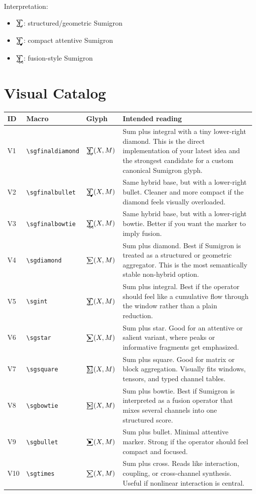 \documentclass[12pt]{article}
\newcommand{\sgoverlay}[2]{\mathop{\mathchoice
  {\ooalign{\hfil$\displaystyle\sum$\hfil\cr\hfil$#1$\hfil\cr}}
  {\ooalign{\hfil$\textstyle\sum$\hfil\cr\hfil$#2$\hfil\cr}}
  {\ooalign{\hfil$\scriptstyle\sum$\hfil\cr\hfil$#2$\hfil\cr}}
  {\ooalign{\hfil$\scriptscriptstyle\sum$\hfil\cr\hfil$#2$\hfil\cr}}
}}
\newcommand{\sgsumintright}[1]{\mathop{\mathchoice
  {\ooalign{
    \hfil$\displaystyle\sum$\hfil\cr
    \hfil$\displaystyle\int$\hfil\cr
    \hidewidth\raisebox{-1.35ex}{\kern1.25ex$\scriptstyle #1$}\hidewidth\cr
  }}
  {\ooalign{
    \hfil$\textstyle\sum$\hfil\cr
    \hfil$\textstyle\int$\hfil\cr
    \hidewidth\raisebox{-1.00ex}{\kern1.00ex$\scriptscriptstyle #1$}\hidewidth\cr
  }}
  {\ooalign{
    \hfil$\scriptstyle\sum$\hfil\cr
    \hfil$\scriptstyle\int$\hfil\cr
    \hidewidth\raisebox{-0.75ex}{\kern0.75ex$\scriptscriptstyle #1$}\hidewidth\cr
  }}
  {\ooalign{
    \hfil$\scriptscriptstyle\sum$\hfil\cr
    \hfil$\scriptscriptstyle\int$\hfil\cr
    \hidewidth\raisebox{-0.60ex}{\kern0.55ex$\scriptscriptstyle #1$}\hidewidth\cr
  }}
}}
\newcommand{\sgdiamond}{\sgoverlay{\displaystyle\diamond}{\textstyle\diamond}}
\newcommand{\sgint}{\sgoverlay{\displaystyle\int}{\textstyle\int}}
\newcommand{\sgstar}{\sgoverlay{\displaystyle\star}{\textstyle\star}}
\newcommand{\sgsquare}{\sgoverlay{\displaystyle\square}{\textstyle\square}}
\newcommand{\sgbowtie}{\sgoverlay{\displaystyle\bowtie}{\textstyle\bowtie}}
\newcommand{\sgbullet}{\sgoverlay{\displaystyle\bullet}{\textstyle\bullet}}
\newcommand{\sgtimes}{\sgoverlay{\displaystyle\times}{\textstyle\times}}
\newcommand{\sgfinaldiamond}{\sgsumintright{\diamond}}
\newcommand{\sgfinalbullet}{\sgsumintright{\bullet}}
\newcommand{\sgfinalbowtie}{\sgsumintright{\bowtie}}
\begin{document}
\noindent
Interpretation:
\begin{itemize}
\item \(\sgfinaldiamond\): structured/geometric Sumigron
\item \(\sgfinalbullet\): compact attentive Sumigron
\item \(\sgfinalbowtie\): fusion-style Sumigron
\end{itemize}

\section*{Visual Catalog}
\renewcommand{\arraystretch}{1.3}
\begin{longtable}{>{\raggedright\arraybackslash}p{1.1cm} >{\centering\arraybackslash}p{2.0cm} >{\centering\arraybackslash}p{2.8cm} >{\raggedright\arraybackslash}p{8.3cm}}
\toprule
ID & Macro & Glyph & Intended reading \\
\midrule
\endhead
V1 & \texttt{\textbackslash sgfinaldiamond} & \(\sgfinaldiamond(X,M)\) & Sum plus integral with a tiny lower-right diamond. This is the direct implementation of your latest idea and the strongest candidate for a custom canonical Sumigron glyph. \\
V2 & \texttt{\textbackslash sgfinalbullet} & \(\sgfinalbullet(X,M)\) & Same hybrid base, but with a lower-right bullet. Cleaner and more compact if the diamond feels visually overloaded. \\
V3 & \texttt{\textbackslash sgfinalbowtie} & \(\sgfinalbowtie(X,M)\) & Same hybrid base, but with a lower-right bowtie. Better if you want the marker to imply fusion. \\
V4 & \texttt{\textbackslash sgdiamond} & \(\sgdiamond(X,M)\) & Sum plus diamond. Best if Sumigron is treated as a structured or geometric aggregator. This is the most semantically stable non-hybrid option. \\
V5 & \texttt{\textbackslash sgint} & \(\sgint(X,M)\) & Sum plus integral. Best if the operator should feel like a cumulative flow through the window rather than a plain reduction. \\
V6 & \texttt{\textbackslash sgstar} & \(\sgstar(X,M)\) & Sum plus star. Good for an attentive or salient variant, where peaks or informative fragments get emphasized. \\
V7 & \texttt{\textbackslash sgsquare} & \(\sgsquare(X,M)\) & Sum plus square. Good for matrix or block aggregation. Visually fits windows, tensors, and typed channel tables. \\
V8 & \texttt{\textbackslash sgbowtie} & \(\sgbowtie(X,M)\) & Sum plus bowtie. Best if Sumigron is interpreted as a fusion operator that mixes several channels into one structured score. \\
V9 & \texttt{\textbackslash sgbullet} & \(\sgbullet(X,M)\) & Sum plus bullet. Minimal attentive marker. Strong if the operator should feel compact and focused. \\
V10 & \texttt{\textbackslash sgtimes} & \(\sgtimes(X,M)\) & Sum plus cross. Reads like interaction, coupling, or cross-channel synthesis. Useful if nonlinear interaction is central. \\
\bottomrule
\end{longtable}
\end{document}
